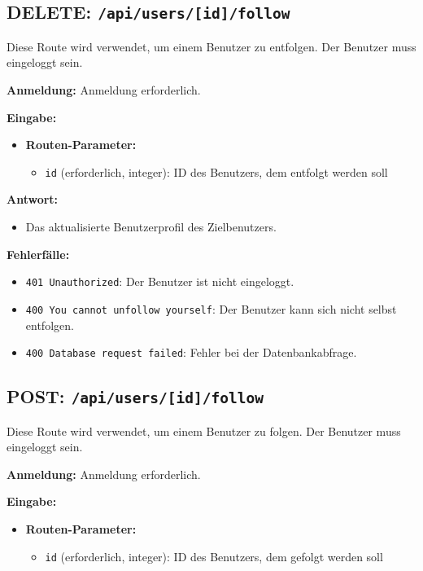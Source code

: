 \documentclass[a4paper,12pt]{article}
\begin{document}
\subsection{DELETE: \texttt{/api/users/[id]/follow}}

Diese Route wird verwendet, um einem Benutzer zu entfolgen. Der Benutzer muss eingeloggt sein.

\textbf{Anmeldung:} Anmeldung erforderlich.

\textbf{Eingabe:}
\begin{itemize}
    \item \textbf{Routen-Parameter:}
    \begin{itemize}
        \item \texttt{id} (erforderlich, integer): ID des Benutzers, dem entfolgt werden soll
    \end{itemize}
\end{itemize}

\textbf{Antwort:}
\begin{itemize}
    \item Das aktualisierte Benutzerprofil des Zielbenutzers.
\end{itemize}

\textbf{Fehlerfälle:}
\begin{itemize}
    \item \texttt{401 Unauthorized}: Der Benutzer ist nicht eingeloggt.
    \item \texttt{400 You cannot unfollow yourself}: Der Benutzer kann sich nicht selbst entfolgen.
    \item \texttt{400 Database request failed}: Fehler bei der Datenbankabfrage.
\end{itemize}

\subsection{POST: \texttt{/api/users/[id]/follow}}

Diese Route wird verwendet, um einem Benutzer zu folgen. Der Benutzer muss eingeloggt sein.

\textbf{Anmeldung:} Anmeldung erforderlich.

\textbf{Eingabe:}
\begin{itemize}
    \item \textbf{Routen-Parameter:}
    \begin{itemize}
        \item \texttt{id} (erforderlich, integer): ID des Benutzers, dem gefolgt werden soll
    \end{itemize}
\end{itemize}
\end{document}
